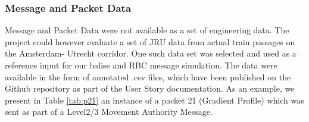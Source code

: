 \documentclass{template/openetcs_article}
\begin{document}
\subsubsection{Message and Packet Data}

Message and Packet Data were not available as a set of engineering data. The project could however evaluate a set of JRU data from actual train passages on the Amsterdam- Utrecht corridor. One such data set was selected and used as a reference input for our balise and RBC message simulation.
The data were available in the form of annotated .csv files, which have been published on the Github repository as part of the User Story documentation.
As an example, we present in Table \ref{tab:p21} an instance of a packet 21 (Gradient Profile) which was sent as part of a Level2/3 Movement Authority Message. 
\end{document}
